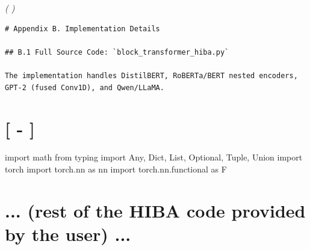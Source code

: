 \textit{(                                                 )}

\begin{lstlisting}
# Appendix B. Implementation Details

## B.1 Full Source Code: `block_transformer_hiba.py`

The implementation handles DistilBERT, RoBERTa/BERT nested encoders, GPT-2 (fused Conv1D), and Qwen/LLaMA.

\end{lstlisting}
\section{[                                                            -                                                                                      ]}
import math
from typing import Any, Dict, List, Optional, Tuple, Union
import torch
import torch.nn as nn
import torch.nn.functional as F
\section{... (rest of the HIBA code provided by the user) ...}

\begin{lstlisting}

\end{lstlisting}



\subsubsection{}

